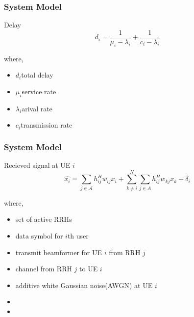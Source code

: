 \documentclass[usenames,dvipsnames]{beamer}
\begin{document}
\begin{frame}
  \frametitle{System Model}
  \begin{exampleblock}{Delay}
    \[
      d_{i} = \frac{1}{\mu_{i}- \lambda_{i}} + \frac{1}{c_{i} - \lambda_{i}}
    \]
  \end{exampleblock}
  where,
  \begin{itemize}
    \item  $d_{i}$\quad total delay
    \item $\mu_{i}$\quad service rate
    \item $\lambda_{i}$\quad arival rate
    \item $c_{i}$\quad transmission rate
  \end{itemize}
\end{frame}
\begin{frame}
  \frametitle{System Model}
  \begin{exampleblock}{Recieved signal at UE $i$}
    \[
      \hat{x_{i}} = \sum_{j\in{\mathcal{A}}}^{}h_{ij}^{H}w_{ij}x_{i} + \sum_{k\neq i}^{N}\sum_{j\in{A}}^{}h_{ij}^{H}w_{kj}x_{k} + \delta_{i}
    \]
  \end{exampleblock}
  where,
  \begin{itemize}
    \item { set of active RRHs}
    \item { data symbol for $i$th user}
    \item { transmit beamformer for UE $i$ from RRH $j$}
    \item { channel from RRH $j$ to UE $i$}
    \item { additive white Gaussian noise(AWGN) at UE $i$}
    \item {}
    \item {}
  \end{itemize}
\end{frame}
\end{document}
